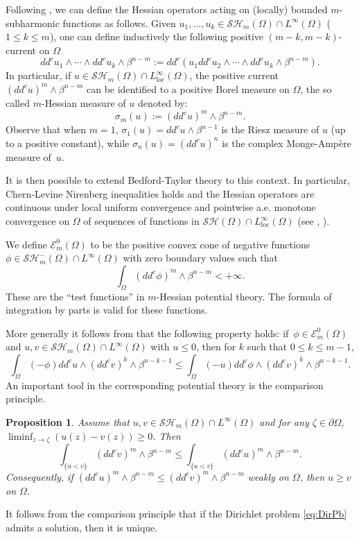 \documentclass[JEP,XML,SOM,Unicode]{cedram}
\newcommand{\loc}{\mathrm{loc}}
\newtheorem{proposition}[theorem]{Proposition}
\theoremstyle{definition}
\begin{document}
Following \cite{Bl05}, we can define the Hessian operators acting on (locally) bounded $m$-subharmonic functions as follows. Given $u_1,\dots, u_k \in \mathcal{SH}_m (\Omega) \cap L^{\infty} (\Omega)$ ($1 \leq k \leq m$), one can define inductively the following positive $(m-k,m-k)$-current on $\Omega$
\[
dd^c u_1 \wedge \cdots \wedge dd^c u_k \wedge \beta^{n - m}:= dd^c (u_1 dd^c u_2 \wedge \cdots \wedge dd^c u_k \wedge \beta^{n - m}).
\]
In particular, if $u \in \mathcal{SH}_m (\Omega) \cap L^{\infty}_{\loc} (\Omega)$, the positive current $(dd^c u)^m \wedge \beta^{n-m}$ can be identified to a positive Borel measure on $\Omega$, the so called $m$-Hessian measure of $u$ denoted by:
\[
\sigma_m (u):= (dd^c u)^m \wedge \beta^{n-m}.
\]
Observe that when $m\!=\! 1$, $\sigma_1 (u) \!=\! dd^c u \wedge \beta^{n-1}$ is the Riesz measure of $u$ (up to a positive constant), while $\sigma_n (u) \!=\! (dd^c u)^n$ is the complex Monge-Ampère measure of~$u$.

It is then possible to extend Bedford-Taylor theory to this context.
In particular, Chern-Levine Nirenberg inequalities holds and the Hessian operators are continuous under local uniform convergence and pointwise a.e. monotone convergence
on $\Omega$ of sequences of functions in $\mathcal{SH} (\Omega) \cap L^{\infty}_{\loc} (\Omega)$ (see \cite{Bl05}, \cite{Lu12}).

We define $\mathcal{E}_m^0 (\Omega) $ to be the positive convex cone of negative functions $\phi \in \mathcal{SH}^-_m (\Omega) \cap L^{\infty} (\Omega)$ with zero boundary values such that
\[
\int_{\Omega} (dd^c \phi)^m \wedge \beta^{n - m} < + \infty.
\]
These are the ``test functions'' in $m$-Hessian potential theory. The formula of integration by parts is valid for these functions.

More generally it follows from \cite{Lu12,Lu15} that the following property holds: if~$\phi \in \mathcal{E}_m^0 (\Omega) $ and $u, v \in \mathcal{SH}_m (\Omega) \cap L^{\infty} (\Omega)$ with $u \leq 0$, then for $k$ such that $0 \leq k \leq m - 1$,
\begin{equation} \label{eq:testinequality}
\int_\Omega (-\phi) dd^c u \wedge (dd^c v)^k \wedge \beta^{n - k-1} \leq \int_\Omega (-u) dd^c \phi \wedge (dd^c v)^k \wedge \beta^{n - k-1}.
\end{equation}
An important tool in the corresponding potential theory is the comparison principle.

\begin{proposition} \label{prop:comparison principle}
Assume that $u,v\in \mathcal{SH}_m(\Omega)\cap L^{\infty}(\Omega)$ and for any $\zeta \in \partial \Omega$, $\liminf_{z \to \zeta }(u(z)- v(z))\geq 0$. Then
\[
\int_{\{u<v\}}(dd^c v)^m\wedge\beta^{n-m} \leq \int_{\{u<v\}}(dd^c u)^m\wedge\beta^{n-m}.
\]
Consequently, if $(dd^cu)^m\wedge\beta^{n-m}\leq(dd^cv)^m\wedge\beta^{n-m}$ weakly on $\Omega$, then $u \geq v$ on $\Omega$.

\end{proposition}
It follows from the comparison principle that if the Dirichlet problem \eqref{eq:DirPb} admits a solution, then it is unique.
\end{document}
